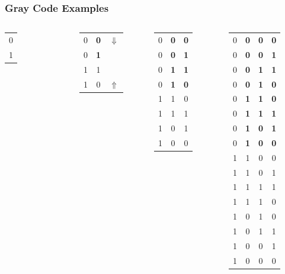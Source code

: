 \documentclass[11pt]{beamer}
\newcommand{\memph}[1]{{\color{dredcolor}\bf #1}}
\begin{document}
\begin{frame}
\frametitle{Gray Code Examples} 

\begin{columns}

\begin{tabular}{c}
0\\
1\\
\end{tabular}

\begin{tabular}{ccc}
0 & \memph{0} & $\Downarrow$\\
0 & \memph{1} & \\
1 & 1 & \\
1 & 0 & $\Uparrow$\\
\end{tabular}

\begin{tabular}{ccc}
0 & \memph{0} & \memph{0}\\
0 & \memph{0} & \memph{1}\\
0 & \memph{1} & \memph{1}\\
0 & \memph{1} & \memph{0}\\
1 & 1 & 0\\
1 & 1 & 1\\
1 & 0 & 1\\
1 & 0 & 0\\
\end{tabular}


\begin{tabular}{cccc}
0 & \memph{0} & \memph{0} & \memph{0}\\
0 & \memph{0} & \memph{0} & \memph{1}\\
0 & \memph{0} & \memph{1} & \memph{1}\\
0 & \memph{0} & \memph{1} & \memph{0}\\
0 & \memph{1} & \memph{1} & \memph{0}\\
0 & \memph{1} & \memph{1} & \memph{1}\\
0 & \memph{1} & \memph{0} & \memph{1}\\
0 & \memph{1} & \memph{0} & \memph{0}\\
1 & 1 & 0 & 0\\
1 & 1 & 0 & 1\\
1 & 1 & 1 & 1\\
1 & 1 & 1 & 0\\
1 & 0 & 1 & 0\\
1 & 0 & 1 & 1\\
1 & 0 & 0 & 1\\
1 & 0 & 0 & 0\\
\end{tabular}\\

\end{columns}

\end{frame}
\end{document}
